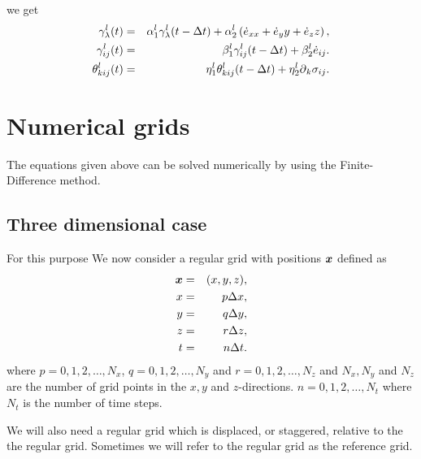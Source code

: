 \documentclass[11pt]{article}
\begin{document}
%
we get
\begin{eqnarray}
\gamma^l_{\lambda}(t)  & = &\alpha^l_1 \gamma^l_{\lambda}(t-\Delta t) 
                        + \alpha^l_2\left( \dot{e}_{xx}+ \dot{e}_yy+
                          \dot{e}_zz\right) ,\nonumber \\
\gamma^l_{ij}(t)      & = &\beta^l_1 \gamma^l_{ij}(t - \Delta t) 
                        + \beta^l_2\dot{e}_{ij}.\nonumber\\
\theta^l_{kij}(t)      & = &\eta^l_{1} \theta^l_{kij}(t - \Delta t) 
                        + \eta^l_2\mbox{$\partial$}_k \sigma_{ij}.\nonumber\\
\end{eqnarray}
%
\section{Numerical grids}
The equations given above can be solved numerically by using the 
Finite-Difference method. 


\subsection{Three dimensional case}

For this purpose We now consider a regular grid with positions $\mbox{\boldmath $x$}$ 
defined as
\begin{eqnarray}
\mbox{\boldmath $x$} & = & (x,y,z),\\
x   & = & p\Delta x,\\
y   & = & q\Delta y,\\
z   & = & r\Delta z,\\
t   & = & n\Delta t.
\end{eqnarray}
where $p=0,1,2,\ldots,N_x$, $q=0,1,2,\ldots,N_y$ and $r=0,1,2,\ldots,N_z$ and
$N_x,N_y$ and $N_z$ are the number of grid points in the $x,y$ and 
$z$-directions.
$n=0,1,2,\ldots,N_t$ where $N_t$ is the number of time steps.

We will also need a regular grid which is displaced, or staggered, 
relative to the the regular grid.
Sometimes we will refer to the regular grid as the reference grid.
\end{document}
